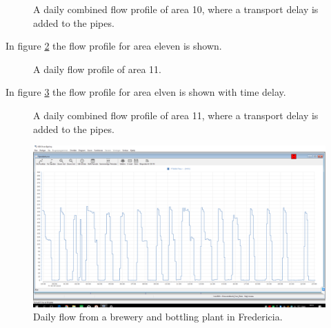 \begin{figure}[H]
\centering

\caption{A daily combined flow profile of area 10, where a transport delay is added to the pipes.}
\label{fig:flow_profile_zone_10_combined_with_delay}
\end{figure} 

In figure \ref{fig:APP_flow_profile_zone11} the flow profile for area eleven is shown.

\begin{figure}[H]
\centering

\caption{A daily flow profile of area 11.}
\label{fig:APP_flow_profile_zone11}
\end{figure} 

In figure \ref{fig:flow_profile_zone_11_combined_with_delay} the flow profile for area elven is shown with time delay. 

\begin{figure}[H]
\centering

\caption{A daily combined flow profile of area 11, where a transport delay is added to the pipes.}
\label{fig:flow_profile_zone_11_combined_with_delay}
\end{figure} 


\begin{figure}[H]
	\centering
	\includegraphics[width=0.95\textheight, angle=-90]{report/appendix/figures/Carlsberg_data.png}
	\caption{Daily flow from a brewery and bottling plant in Fredericia.}
	\label{fig:Carlsberg_data}
\end{figure}

